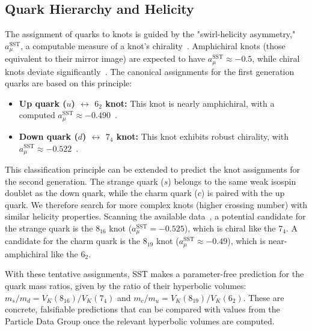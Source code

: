 \documentclass[11pt, a4paper]{article}
\begin{document}
    \subsection{Quark Hierarchy and Helicity}

        The assignment of quarks to knots is guided by the "swirl-helicity asymmetry," $a_{\mu}^{\text{SST}}$, a computable measure of a knot's chirality~\cite{sst_canon}. Amphichiral knots (those equivalent to their mirror image) are expected to have $a_{\mu}^{\text{SST}} \approx -0.5$, while chiral knots deviate significantly~\cite{sst_canon}. The canonical assignments for the first generation quarks are based on this principle:
        \begin{itemize}
        \item \textbf{Up quark ($u$) $\leftrightarrow$ $6_2$ knot:} This knot is nearly amphichiral, with a computed $a_{\mu}^{\text{SST}} \approx -0.490$~\cite{sst_canon}.
        \item \textbf{Down quark ($d$) $\leftrightarrow$ $7_4$ knot:} This knot exhibits robust chirality, with $a_{\mu}^{\text{SST}} \approx -0.522$~\cite{sst_canon}.
        \end{itemize}
        This classification principle can be extended to predict the knot assignments for the second generation. The strange quark ($s$) belongs to the same weak isospin doublet as the down quark, while the charm quark ($c$) is paired with the up quark. We therefore search for more complex knots (higher crossing number) with similar helicity properties. Scanning the available data~\cite{sst_canon}, a potential candidate for the strange quark is the $8_{16}$ knot ($a_{\mu}^{\text{SST}} = -0.525$), which is chiral like the $7_4$. A candidate for the charm quark is the $8_{19}$ knot ($a_{\mu}^{\text{SST}} \approx -0.49$), which is near-amphichiral like the $6_2$.

        With these tentative assignments, SST makes a parameter-free prediction for the quark mass ratios, given by the ratio of their hyperbolic volumes: $m_s/m_d = V_K(8_{16}) / V_K(7_4)$ and $m_c/m_u = V_K(8_{19}) / V_K(6_2)$. These are concrete, falsifiable predictions that can be compared with values from the Particle Data Group once the relevant hyperbolic volumes are computed.
\end{document}
